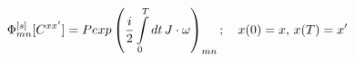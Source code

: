 \begin{equation}
\Phi^{[s]}_{mn}[C^{xx'}]=Pexp\left({i\over 2}\int\limits_0^Tdt\,J\cdot\omega\right)_{mn}
;\quad x(0)=x,\,x(T)=x'
\end{equation}


